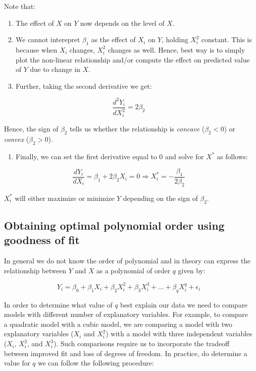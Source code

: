 \documentclass[
]{book}
\providecommand{\tightlist}{%
  \setlength{\itemsep}{0pt}\setlength{\parskip}{0pt}}
\theoremstyle{definition}
\theoremstyle{definition}
\theoremstyle{definition}
\theoremstyle{definition}
\theoremstyle{remark}
\begin{document}
Note that:

\begin{enumerate}
\def\labelenumi{\arabic{enumi}.}
\item
  The effect of \(X\) on \(Y\) now depends on the level of \(X\).
\item
  We cannot interepret \(\beta_1\) as the effect of \(X_i\) on \(Y\), holding \(X_i^2\) constant. This is because when \(X_i\) changes, \(X_i^2\) changes as well. Hence, best way is to simply plot the non-linear relationship and/or compute the effect on predicted value of \(Y\) due to change in \(X\).
\item
  Further, taking the second derivative we get:
\end{enumerate}

\[\frac{d^2Y_i}{dX_i^2}=2 \beta_2\]

Hence, the sign of \(\beta_2\) tells us whether the relationship is \emph{concave} (\(\beta_2<0\)) or \emph{convex} (\(\beta_2>0\)).

\begin{enumerate}
\def\labelenumi{\arabic{enumi}.}
\setcounter{enumi}{3}
\tightlist
\item
  Finally, we can set the first derivative equal to \(0\) and solve for \(X^*\) as follows:
\end{enumerate}

\[\frac{dY_i}{dX_i}=\beta_1 + 2 \beta_2 X_i= 0 \Rightarrow X^*_i=-\frac{\beta_1}{2\beta_2}\]

\(X^*_i\) will either maximize or minimize \(Y\) depending on the sign of \(\beta_2\).

\hypertarget{obtaining-optimal-polynomial-order-using-goodness-of-fit}{%
\subsection{Obtaining optimal polynomial order using goodness of fit}\label{obtaining-optimal-polynomial-order-using-goodness-of-fit}}

In general we do not know the order of polynomial and in theory can express the relationship between \(Y\) and \(X\) as a polynomial of order \(q\) given by:

\[Y_i = \beta_0 + \beta_1 X_i + \beta_2 X_i^2 + \beta_3 X_i^3+...+ \beta_q X_i^q + \epsilon_i\]

In order to determine what value of \(q\) best explain our data we need to compare models with different number of explanatory variables. For example, to compare a quadratic model with a cubic model, we are comparing a model with two explanatory variables (\(X_i\) and \(X_i^2\)) with a model with three independent variables (\(X_i\), \(X_i^2\), and \(X_i^3\)). Such comparisons require us to incorporate the tradeoff between improved fit and loss of degrees of freedom. In practice, do determine a value for \(q\) we can follow the following procedure:
\end{document}
